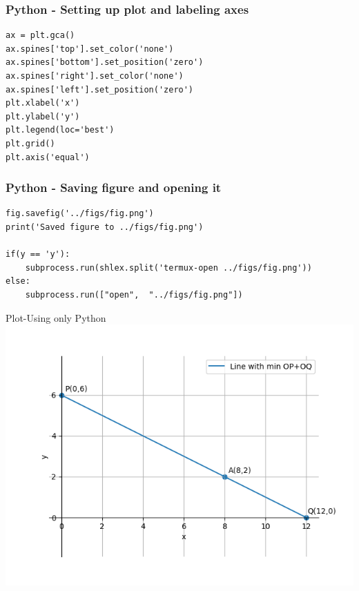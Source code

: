 \documentclass{beamer}
\begin{document}
\begin{frame}[fragile]
    \frametitle{Python - Setting up plot and labeling axes}
    \begin{lstlisting}
ax = plt.gca()
ax.spines['top'].set_color('none')
ax.spines['bottom'].set_position('zero')
ax.spines['right'].set_color('none')
ax.spines['left'].set_position('zero')
plt.xlabel('x')
plt.ylabel('y')
plt.legend(loc='best')
plt.grid()
plt.axis('equal')
\end{lstlisting}
\end{frame}

\begin{frame}[fragile]
    \frametitle{Python - Saving figure and opening it}
    \begin{lstlisting}
fig.savefig('../figs/fig.png')
print('Saved figure to ../figs/fig.png')

if(y == 'y'):
    subprocess.run(shlex.split('termux-open ../figs/fig.png'))
else:
    subprocess.run(["open",  "../figs/fig.png"])
    \end{lstlisting}
\end{frame}


\begin{frame}{Plot-Using only Python}
    \centering
    \includegraphics[width=\columnwidth, height=0.8\textheight, keepaspectratio]{../figs/fig.png}     
\end{frame}
\end{document}
